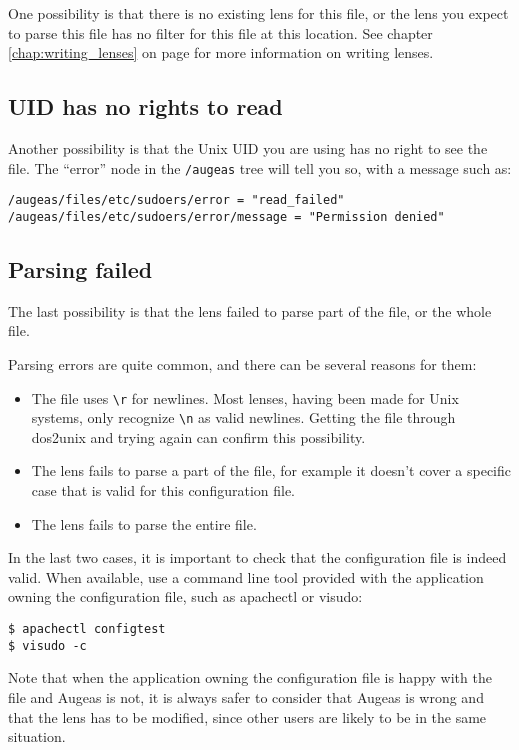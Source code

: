 One possibility is that there is no existing lens for this file, or the lens you expect to parse this file has no filter for this file at this location. See chapter \ref{chap:writing_lenses} on page \pageref{chap:writing_lenses} for more information on writing lenses.

\subsection{UID has no rights to read}

Another possibility is that the Unix UID you are using has no right to see the file. The ``error'' node in the \verb!/augeas! tree will tell you so, with a message such as:


\begin{verbatim}
/augeas/files/etc/sudoers/error = "read_failed"
/augeas/files/etc/sudoers/error/message = "Permission denied"
\end{verbatim}
\subsection{Parsing failed}

The last possibility is that the lens failed to parse part of the file, or the whole file.

Parsing errors are quite common, and there can be several reasons for them:

\begin{itemize}
\item
  The file uses \verb!\r! for newlines. Most lenses, having been made for Unix systems, only recognize \verb!\n! as valid newlines. Getting the file through dos2unix and trying again can confirm this possibility.
\item
  The lens fails to parse a part of the file, for example it doesn't cover a specific case that is valid for this configuration file.
\item
  The lens fails to parse the entire file.
\end{itemize}
In the last two cases, it is important to check that the configuration file is indeed valid. When available, use a command line tool provided with the application owning the configuration file, such as apachectl or visudo:

\begin{verbatim}
$ apachectl configtest
$ visudo -c
\end{verbatim}
Note that when the application owning the configuration file is happy with the file and Augeas is not, it is always safer to consider that Augeas is wrong and that the lens has to be modified, since other users are likely to be in the same situation.

